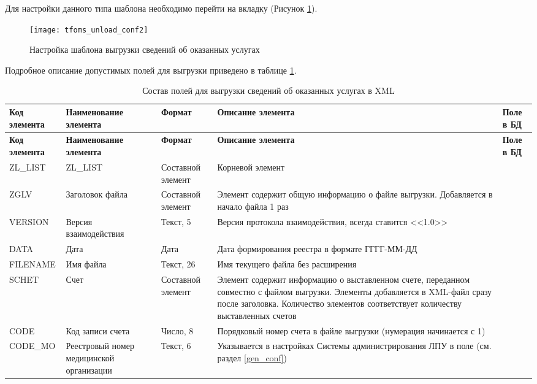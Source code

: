Для настройки данного типа шаблона необходимо перейти на вкладку  (Рисунок \ref{img_tfoms_unload_conf2}).

\begin{figure}[ht]\centering
 \texttt{[image: tfoms\_unload\_conf2]}
 \caption{Настройка шаблона выгрузки сведений об оказанных услугах}
 \label{img_tfoms_unload_conf2}
\end{figure}

Подробное описание допустимых полей для выгрузки приведено в таблице \ref{tbl_tfoms_srv_xml}.

\small{
\begin{longtable}{|p{2.1cm}|p{2.6cm}|p{2cm}|p{5cm}|p{4cm}|}
\caption{Состав полей для выгрузки сведений об оказанных услугах в XML \label{tbl_tfoms_srv_xml}}\\
\hline \rule{0pt}{15pt} \centering \textbf{Код элемента} & \centering \textbf{Наимено\-ва\-ние элемента} & \centering \textbf{Формат}  & \centering \textbf{Описание элемента} & \hfil \textbf{Поле в БД} \\ \hline
\endfirsthead
\hline \rule{0pt}{15pt} \centering \textbf{Код элемента} & \centering \textbf{Наимено\-ва\-ние элемента} & \centering \textbf{Формат}  & \centering \textbf{Описание элемента} & \hfil \textbf{Поле в БД} \\ \hline
\endhead
ZL\_LIST &	ZL\_LIST &	Составной элемент	& Корневой элемент  &  \\ \hline	
ZGLV &	Заголовок файла	& Составной элемент &	Элемент содержит общую информацию о файле выгрузки. Добавляется в начало файла 1 раз	&  \\ \hline
VERSION	& Версия взаимодействия	& Текст, 5 & 	Версия протокола взаимодействия, всегда ставится <<1.0>> &  \\ \hline	
DATA	& Дата	& Дата	& Дата формирования реестра в формате ГГГГ-ММ-ДД &  \\ \hline	
FILENAME	& Имя файла	& Текст, 26	& Имя текущего файла без расширения	&  \\ \hline
SCHET	& Счет	& Составной элемент	& Элемент содержит информацию о выставленном счете, переданном совместно с файлом выгрузки. Элементы добавляется в XML-файл сразу после заголовка. Количество элементов соответствует количеству выставленных счетов &  \\ \hline	
CODE	& Код записи счета	& Число, 8	& Порядковый номер счета в файле выгрузки (нумерация начинается с 1) &  \\ \hline	
CODE\_MO	& Реестровый номер медицинской организации	& Текст, 6 & 	Указывается в настройках Системы администрирования ЛПУ в поле \dm{ИНФИС код ЛПУ} (см. раздел \ref{gen_conf}) &  \\ \hline

\end{longtable}}
